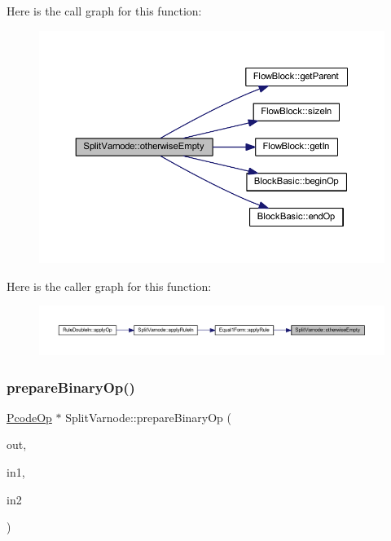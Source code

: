 Here is the call graph for this function\+:
\nopagebreak
\begin{figure}[H]
\begin{center}
\leavevmode
\includegraphics[width=350pt]{class_split_varnode_a9f91b0588de935c3f07a1cb7e59949a5_cgraph}
\end{center}
\end{figure}
Here is the caller graph for this function\+:
\nopagebreak
\begin{figure}[H]
\begin{center}
\leavevmode
\includegraphics[width=350pt]{class_split_varnode_a9f91b0588de935c3f07a1cb7e59949a5_icgraph}
\end{center}
\end{figure}
\mbox{\label{class_split_varnode_a38d72b3185eeb4255fb3d1c997780977}} 
\subsubsection{\texorpdfstring{prepareBinaryOp()}{prepareBinaryOp()}}
{\footnotesize\ttfamily \mbox{\hyperlink{class_pcode_op}{Pcode\+Op}} $\ast$ Split\+Varnode\+::prepare\+Binary\+Op (\begin{DoxyParamCaption}\item[{\mbox{\hyperlink{class_split_varnode}{Split\+Varnode}} \&}]{out,  }\item[{\mbox{\hyperlink{class_split_varnode}{Split\+Varnode}} \&}]{in1,  }\item[{\mbox{\hyperlink{class_split_varnode}{Split\+Varnode}} \&}]{in2 }\end{DoxyParamCaption})\hspace{0.3cm}{\ttfamily [static]}}



